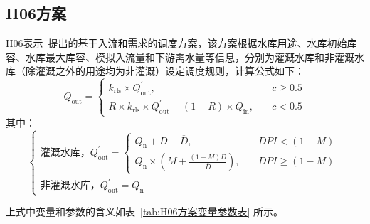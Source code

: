 \subsection{H06方案}
H06表示~\citet{hanasaki2006reservoir}提出的基于入流和需求的调度方案，该方案根据水库用途、水库初始库容、水库最大库容、模拟入流量和下游需水量等信息，分别为灌溉水库和非灌溉水库（除灌溉之外的用途均为非灌溉）设定调度规则，计算公式如下：
\begin{equation}
  Q_{\mathrm{out}}=\begin{cases}
    k_{\mathrm{rls}} \times Q_{\mathrm{out}}^{'}, & \quad c \geqslant 0.5 \\
    R \times k_{\mathrm{rls}} \times Q_{\mathrm{out}}^{'}+\left(1-R\right) \times Q_{\mathrm{in}}, & \quad c<0.5
  \end{cases}
\end{equation}
%
其中：
\begin{equation}
  \begin{cases}
    \text{灌溉水库，} Q_{\mathrm{out}}^{'}= \begin{cases}
      Q_{\mathrm{n}}+D-\overline{D}, &\quad DPI<(1-M)\\
      Q_{\mathrm{n}} \times \left(M+\frac{\left(1-M\right)D}{\overline{D}}\right), &\quad DPI \geqslant (1-M)
    \end{cases}\\
    \text{非灌溉水库，} Q_{\mathrm{out}}^{'}=Q_{\mathrm{n}}
  \end{cases}
\end{equation}

上式中变量和参数的含义如表~\ref{tab:H06方案变量参数表} 所示。

